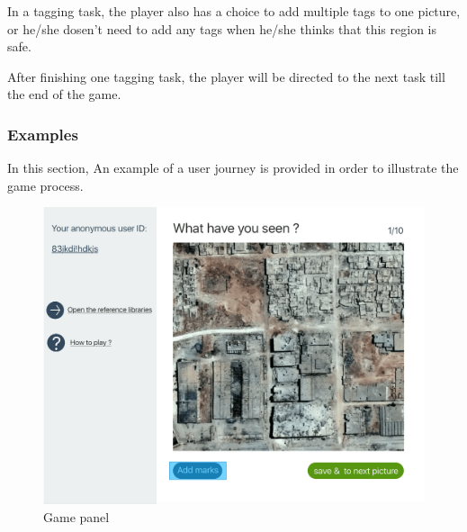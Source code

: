      In a tagging task,
      the player also has a choice to add multiple tags to one picture,
      or he/she dosen't need to add any tags when he/she thinks that this region is safe.

      After finishing one tagging task, 
      the player will be directed to the next task till the end of the game.


      \subsubsection{Examples}
      In this section,
      An example of a user journey is provided in order to illustrate the game process.

      \noindent\begin{minipage}{.45\textwidth}
      \begin{figure}[H]
      \centering
      \includegraphics[width=\textwidth]{figures/function-player-0}
      \caption{Game panel\cite{satellite-photo-1}}
      \label{fig:player0}
      \end{figure}
      \end{minipage}\hfill

